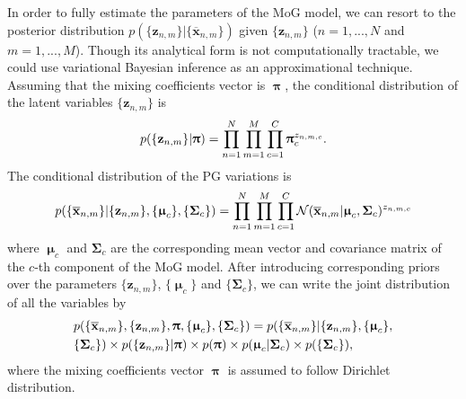 \documentclass[runningheads]{llncs}
\begin{document}
In order to fully estimate the parameters of the MoG model, we can resort to the posterior distribution $p(\{\mathbf{z}_{n,m}\}|\{\mathbf{\overline{x}}_{n,m}\})$ given $\{\mathbf{z}_{n,m}\}$ ($n=1,...,N$ and $m=1,...,M$). Though its analytical form is not computationally tractable, we could use variational Bayesian inference as an approximational technique. Assuming that the mixing coefficients vector is $\boldsymbol{\uppi}$, the conditional distribution of the latent variables $\{\mathbf{z}_{n,m}\}$ is 
\vspace{-0.05in}
\begin{equation}\label{equ1}
\vspace{-0.1in}
p(\{\mathbf{z}_{n,m}\}|\boldsymbol{\uppi}) = \prod_{n=1}^{N}\prod_{m=1}^{M}\prod_{c=1}^{C}\boldsymbol{\uppi}_{c}^{z_{n,m,c}}.
\end{equation}
The conditional distribution of the PG variations is 
\vspace{-0.1in}
\begin{equation}\label{equ2}
\vspace{-0.1in}
p(\{\mathbf{\overline{x}}_{n,m}\}|\{\mathbf{z}_{n,m}\},\{\boldsymbol{\upmu}_{c}\},\{\mathbf{\Sigma}_{c}\}) = \prod_{n=1}^{N}\prod_{m=1}^{M}\prod_{c=1}^{C}\mathcal{N}(\mathbf{\overline{x}}_{n,m}|\boldsymbol{\upmu}_{c},\mathbf{\Sigma}_{c})^{z_{n,m,c}}
\end{equation}
where $\boldsymbol{\upmu}_{c}$ and $\mathbf{\Sigma}_{c}$ are the corresponding mean vector and covariance matrix of the $c$-th component of the MoG model. After introducing corresponding priors over the parameters $\{\mathbf{z}_{n,m}\}$, $\{\boldsymbol{\upmu}_{c}\}$ and $\{\mathbf{\Sigma}_{c}\}$, we can write the joint distribution of all the variables by 
\vspace{-0.05in}
\begin{equation}\label{equ3}
\vspace{-0.05in}
\begin{split}
&p(\{\mathbf{\overline{x}}_{n,m}\},\{\mathbf{z}_{n,m}\},\boldsymbol{\uppi},\{\boldsymbol{\upmu}_{c}\},\{\mathbf{\Sigma}_{c}\}) 
=
p(\{\mathbf{\overline{x}}_{n,m}\}|\{\mathbf{z}_{n,m}\},\{\boldsymbol{\upmu}_{c}\},
\\
&
\{\mathbf{\Sigma}_{c}\})\times p(\{\mathbf{z}_{n,m}\}|\boldsymbol{\uppi})
\times p(\boldsymbol{\uppi})
\times p(\boldsymbol{\upmu}_{c}|\mathbf{\Sigma}_{c})
\times p(\{\mathbf{\Sigma}_{c}\}),
\end{split}
\end{equation}
where the mixing coefficients vector $\boldsymbol{\uppi}$ is assumed to follow Dirichlet distribution.
\end{document}
